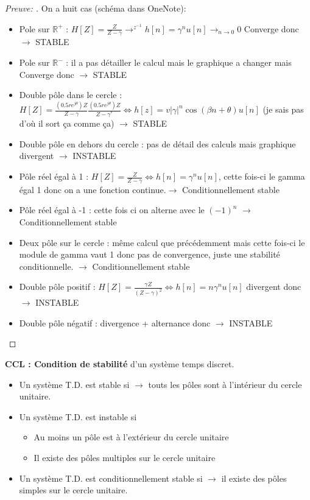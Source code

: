 \documentclass{article}
\theoremstyle{plain}%
\theoremstyle{definition}
\theoremstyle{remark}
\begin{document}
\begin{proof}[Preuve: ]
    On a huit cas (schéma dans OneNote): \begin{itemize}
        \item Pole sur $ \mathbb{R}^+ $ : $ H[Z] = \frac{Z}{Z - \gamma } \to ^{z^{-1}} h[n] = \gamma ^n u[n] \to _{n \to 0} 0 $ Converge donc $\rightarrow$ STABLE
        \item Pole sur $ \mathbb{R}^- $ : il a pas détailler le calcul mais le graphique a changer mais Converge donc $\rightarrow$ STABLE 
        \item Double pôle dans le cercle : $ H[Z] = \frac{(0.5 r e^{j \theta }) Z}{Z - \gamma } \frac{(0.5 r e^{j \theta })Z}{Z - \gamma ^*} \Leftrightarrow h[z] = v \left| \gamma  \right|^n \cos (\beta n + \theta ) u[n] $ (je sais pas d'où il sort ça comme ça)  $\rightarrow$ STABLE
        \item Double pôle en dehors du cercle : pas de détail des calculs mais graphique divergent $\rightarrow$ INSTABLE
        \item Pôle réel égal à 1 : $ H[Z] = \frac{Z}{Z - \gamma } \Leftrightarrow h[n] = \gamma ^n u[n] $, cette fois-ci le gamma égal 1 donc on a une fonction continue.$\rightarrow$ Conditionnellement stable
        \item Pôle réel égal à -1 : cette fois ci on alterne avec le $ (-1)^n $ $\rightarrow$ Conditionnellement stable
        \item Deux pôle sur le cercle : même calcul que précédemment mais cette fois-ci le module de gamma vaut 1 donc pas de convergence, juste une stabilité conditionnelle. $\rightarrow$ Conditionnellement stable
        \item Double pôle positif : $ H[Z] = \frac{\gamma Z}{(Z - \gamma )^2} \Leftrightarrow h[n] = n \gamma ^n u[n] $ divergent donc $\rightarrow$ INSTABLE 
        \item Double pôle négatif : divergence + alternance donc $\rightarrow$ INSTABLE 
    \end{itemize}
\end{proof}

\textbf{CCL : Condition de stabilité} d'un système temps discret. 
\begin{itemize}
    \item Un système T.D. est stable si $\rightarrow$ touts les pôles sont à l'intérieur du cercle unitaire.
    \item Un système T.D. est instable si \begin{itemize}
        \item Au moins un pôle est à l'extérieur du cercle unitaire
        \item Il existe des pôles multiples sur le cercle unitaire
    \end{itemize} 
    \item Un système T.D. est conditionnellement stable si $\rightarrow$ il existe des pôles simples sur le cercle unitaire.
\end{itemize}
\end{document}
